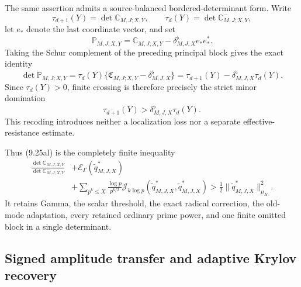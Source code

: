 \documentclass[11pt]{amsart}
\theoremstyle{definition}
\theoremstyle{remark}
\begin{document}
The same assertion admits a source-balanced bordered-determinant form.
Write
\[
 \tau_{d+1}(Y)=\det\mathbb C_{M,J;X,Y},\qquad
 \tau_d(Y)=\det\mathbb C_{M,J;X,Y}^{-},
\]
let \(e_*\) denote the last coordinate vector, and set
\[
 \mathbb P_{M,J;X,Y}
 =\mathbb C_{M,J;X,Y}
  -\delta^{\flat}_{M,J,X}e_*e_*^*.
\]
Taking the Schur complement of the preceding principal block gives the
exact identity
\[
 \boxed{
 \det\mathbb P_{M,J;X,Y}
 =\tau_d(Y)\{
   \mathfrak C_{M,J;X,Y}-\delta^{\flat}_{M,J,X}\}
 =\tau_{d+1}(Y)-\delta^{\flat}_{M,J,X}\tau_d(Y).}
\]
Since \(\tau_d(Y)>0\), finite crossing is therefore precisely the strict
minor domination
\[
 \boxed{\tau_{d+1}(Y)>\delta^{\flat}_{M,J,X}\tau_d(Y).}
\]
This recoding introduces neither a localization loss nor a separate
effective-resistance estimate.

Thus (9.25al) is the completely finite inequality
\[
\begin{aligned}
 \frac{\det\mathbb C_{M,J;X,Y}}
      {\det\mathbb C_{M,J;X,Y}^{-}}
 &+\mathscr E_\Gamma(\widetilde q_{M,J,X}^*)\\
 &+\sum_{p^k\le X}\frac{\log p}{p^{k/2}}
 \mathcal J_{k\log p}(\widetilde q_{M,J,X}^*,
                       \widetilde q_{M,J,X}^*)
 >\frac12\|\widetilde q_{M,J,X}^*\|_{\mu_K}^2.
\end{aligned}
\tag{9.25ao}
\]
It retains Gamma, the scalar threshold, the exact radical correction, the
old-mode adaptation, every retained ordinary prime power, and one finite
omitted block in a single determinant.

\subsection{Signed amplitude transfer and adaptive Krylov recovery}
\label{sec:signed-krylov}
\end{document}

